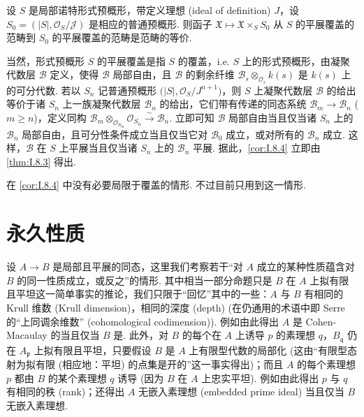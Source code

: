 \begin{corollary}\label{cor:I.8.4}
设 $S$ 是局部诺特形式预概形，带定义理想 (ideal of definition) $J$，设 $S_0 = (|S|, \mathcal{O}_S/\mathcal{J})$ 是相应的普通预概形. 则函子 $\mathfrak{X} \mapsto \mathfrak{X} \times_S S_0$ 从 $S$ 的平展覆盖的范畴到 $S_0$ 的平展覆盖的范畴是范畴的等价.
\end{corollary}

当然，形式预概形 $S$ 的平展覆盖是指 $S$ 的覆盖，i.e. $S$ 上的形式预概形，由凝聚代数层 $\mathcal{B}$ 定义，使得 $\mathcal{B}$ 局部自由，且 $\mathcal{B}$ 的剩余纤维 $\mathcal{B}_s \otimes_{\mathcal{O}_s} k(s)$ 是 $k(s)$ 上的可分代数. 若以 $S_n$ 记普通预概形 $\bigl(|S|, \mathcal{O}_S/J^{n+1}\bigr)$，则 $S$ 上凝聚代数层 $\mathcal{B}$ 的给出等价于诸 $S_n$ 上一族凝聚代数层 $\mathcal{B}_n$ 的给出，它们带有传递的同态系统 $\mathcal{B}_m \to \mathcal{B}_n$ ($m \geqslant n$)，定义同构 $\mathcal{B}_m \otimes_{\mathcal{O}_{S_m}} \mathcal{O}_{S_n} \stackrel{\sim}{\longrightarrow} \mathcal{B}_n$. 立即可知 $\mathcal{B}$ 局部自由当且仅当诸 $S_n$ 上的 $\mathcal{B}_n$ 局部自由，且可分性条件成立当且仅当它对 $\mathcal{B}_0$ 成立，或对所有的 $\mathcal{B}_n$ 成立. 这样，$\mathcal{B}$ 在 $S$ 上平展当且仅当诸 $S_n$ 上的 $\mathcal{B}_n$ 平展. 据此，\ref{cor:I.8.4} 立即由 \ref{thm:I.8.3} 得出.

\begin{remarkstar}
在 \ref{cor:I.8.4} 中没有必要局限于覆盖的情形. 不过目前只用到这一情形.
\end{remarkstar}

\section{永久性质}

设 $A \to B$ 是局部且平展的同态，这里我们考察若干``对 $A$ 成立的某种性质蕴含对 $B$ 的同一性质成立，或反之''的情形. 其中相当一部分命题只是 $B$ 在 $A$ 上拟有限且平坦这一简单事实的推论，我们只限于``回忆''其中的一些：$A$ 与 $B$ 有相同的 Krull 维数 (Krull dimension)，相同的深度 (depth) (在仍通用的术语中即 Serre 的``上同调余维数'' (cohomological codimension)). 例如由此得出 $A$ 是 Cohen-Macaulay 的当且仅当 $B$ 是. 此外，对 $B$ 的每个在 $A$ 上诱导 $p$ 的素理想 $q$，$B_{\mathfrak{q}}$ 仍在 $A_{\mathfrak{p}}$ 上拟有限且平坦，只要假设 $B$ 是 $A$ 上有限型代数的局部化 (这由``有限型态射为拟有限 (相应地：平坦) 的点集是开的''这一事实得出)；而且 $A$ 的每个素理想 $p$ 都由 $B$ 的某个素理想 $q$ 诱导 (因为 $B$ 在 $A$ 上忠实平坦). 例如由此得出 $p$ 与 $q$ 有相同的秩 (rank)；还得出 $A$ 无嵌入素理想 (embedded prime ideal) 当且仅当 $B$ 无嵌入素理想.

